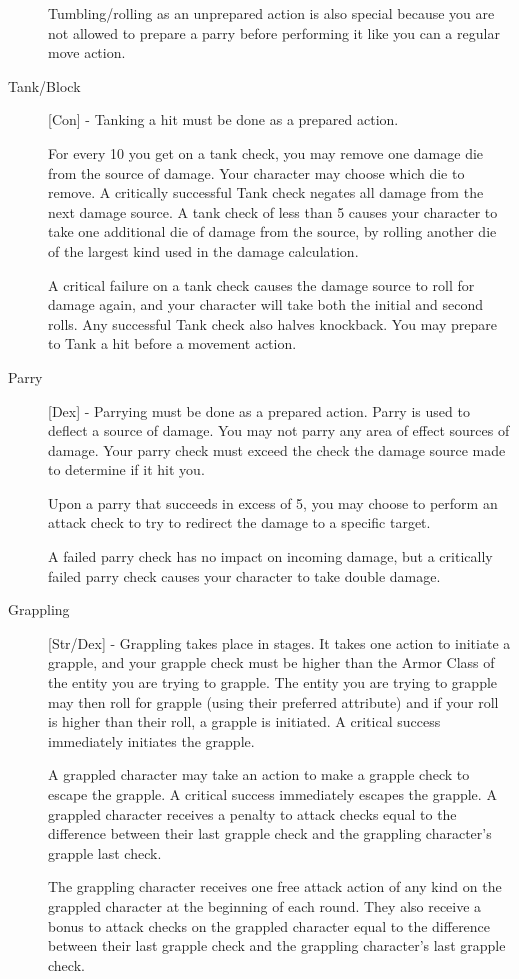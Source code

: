 \begin{description}
Tumbling/rolling as an unprepared action is also special because you are not allowed to prepare a parry before performing it like you can a regular move action.
\item[Tank/Block] [Con] - Tanking a hit must be done as a prepared action.

For every 10 you get on a tank check, you may remove one damage die from the source of damage. Your character may choose which die to remove. A critically successful Tank check negates all damage from the next damage source. A tank check of less than 5 causes your character to take one additional die of damage from the source, by rolling another die of the largest kind used in the damage calculation.

A critical failure on a tank check causes the damage source to roll for damage again, and your character will take both the initial and second rolls. Any successful Tank check also halves knockback. You may prepare to Tank a hit before a movement action.
\item[Parry] [Dex] - Parrying must be done as a prepared action. Parry is used to deflect a source of damage. You may not parry any area of effect sources of damage. Your parry check must exceed the check the damage source made to determine if it hit you.

Upon a parry that succeeds in excess of 5, you may choose to perform an attack check to try to redirect the damage to a specific target.

A failed parry check has no impact on incoming damage, but a critically failed parry check causes your character to take double damage.
\item[Grappling] [Str/Dex] - Grappling takes place in stages. It takes one action to initiate a grapple, and your grapple check must be higher than the Armor Class of the entity you are trying to grapple. The entity you are trying to grapple may then roll for grapple (using their preferred attribute) and if your roll is higher than their roll, a grapple is initiated. A critical success immediately initiates the grapple.

A grappled character may take an action to make a grapple check to escape the grapple. A critical success immediately escapes the grapple. A grappled character receives a penalty to attack checks equal to the difference between their last grapple check and the grappling character’s grapple last check.

The grappling character receives one free attack action of any kind on the grappled character at the beginning of each round. They also receive a bonus to attack checks on the grappled character equal to the difference between their last grapple check and the grappling character’s last grapple check.


\end{description}
